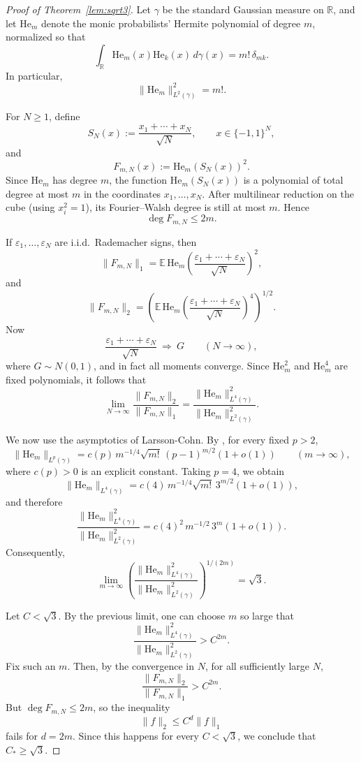 \documentclass[11pt]{article}
\begin{document}
\begin{proof}[Proof of Theorem~\ref{lem:sqrt3}]
Let \(\gamma\) be the standard Gaussian measure on \(\mathbb{R}\), and let \(\mathrm{He}_m\) denote the monic probabilists' Hermite polynomial of degree \(m\), normalized so that
\[
\int_{\mathbb{R}} \mathrm{He}_m(x)\mathrm{He}_k(x)\,d\gamma(x)=m!\,\delta_{mk}.
\]
In particular,
\[
\|\mathrm{He}_m\|_{L^2(\gamma)}^2=m!.
\]

For \(N\ge 1\), define
\[
S_N(x):=\frac{x_1+\cdots+x_N}{\sqrt N},
\qquad x\in\{-1,1\}^N,
\]
and
\[
F_{m,N}(x):=\mathrm{He}_m(S_N(x))^2.
\]
Since \(\mathrm{He}_m\) has degree \(m\), the function \(\mathrm{He}_m(S_N(x))\) is a polynomial of total degree at most \(m\) in the coordinates \(x_1,\dots,x_N\). After multilinear reduction on the cube (using \(x_i^2=1\)), its Fourier--Walsh degree is still at most \(m\). Hence
\[
\deg F_{m,N}\le 2m.
\]

If \(\varepsilon_1,\dots,\varepsilon_N\) are i.i.d.\ Rademacher signs, then
\[
\|F_{m,N}\|_1=\mathbb{E}\,\mathrm{He}_m\!\left(\frac{\varepsilon_1+\cdots+\varepsilon_N}{\sqrt N}\right)^2,
\]
and
\[
\|F_{m,N}\|_2
=
\left(
\mathbb{E}\,\mathrm{He}_m\!\left(\frac{\varepsilon_1+\cdots+\varepsilon_N}{\sqrt N}\right)^4
\right)^{1/2}.
\]
Now
\[
\frac{\varepsilon_1+\cdots+\varepsilon_N}{\sqrt N}\ \Longrightarrow\ G
\qquad(N\to\infty),
\]
where \(G\sim N(0,1)\), and in fact all moments converge. Since \(\mathrm{He}_m^2\) and \(\mathrm{He}_m^4\) are fixed polynomials, it follows that
\[
\lim_{N\to\infty}\frac{\|F_{m,N}\|_2}{\|F_{m,N}\|_1}
=
\frac{\|\mathrm{He}_m\|_{L^4(\gamma)}^2}{\|\mathrm{He}_m\|_{L^2(\gamma)}^2}.
\]

We now use the asymptotics of Larsson-Cohn. By \cite[Theorem~2.1(b)]{LarssonCohn}, for every fixed \(p>2\),
\[
\|\mathrm{He}_m\|_{L^p(\gamma)}
=
c(p)\,m^{-1/4}\sqrt{m!}\,(p-1)^{m/2}(1+o(1))
\qquad(m\to\infty),
\]
where \(c(p)>0\) is an explicit constant. Taking \(p=4\), we obtain
\[
\|\mathrm{He}_m\|_{L^4(\gamma)}
=
c(4)\,m^{-1/4}\sqrt{m!}\,3^{m/2}(1+o(1)),
\]
and therefore
\[
\frac{\|\mathrm{He}_m\|_{L^4(\gamma)}^2}{\|\mathrm{He}_m\|_{L^2(\gamma)}^2}
=
c(4)^2\,m^{-1/2}\,3^m(1+o(1)).
\]
Consequently,
\[
\lim_{m\to\infty}
\left(
\frac{\|\mathrm{He}_m\|_{L^4(\gamma)}^2}{\|\mathrm{He}_m\|_{L^2(\gamma)}^2}
\right)^{1/(2m)}
=
\sqrt3.
\]

Let \(C<\sqrt3\). By the previous limit, one can choose \(m\) so large that
\[
\frac{\|\mathrm{He}_m\|_{L^4(\gamma)}^2}{\|\mathrm{He}_m\|_{L^2(\gamma)}^2}>C^{2m}.
\]
Fix such an \(m\). Then, by the convergence in \(N\), for all sufficiently large \(N\),
\[
\frac{\|F_{m,N}\|_2}{\|F_{m,N}\|_1}>C^{2m}.
\]
But \(\deg F_{m,N}\le 2m\), so the inequality
\[
\|f\|_2\le C^d\|f\|_1
\]
fails for \(d=2m\). Since this happens for every \(C<\sqrt3\), we conclude that \(C_\ast\ge \sqrt3\).
\end{proof}
\end{document}
